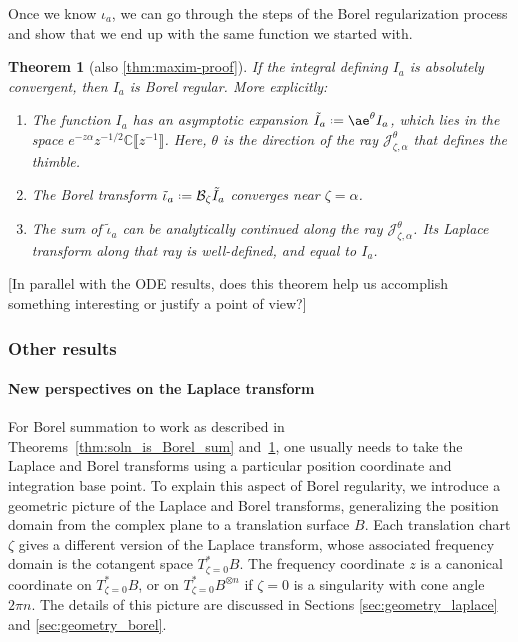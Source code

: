 \documentclass{article}
\newcommand{\C}{\mathbb{C}}
\newcommand{\series}[1]{\tilde{#1}}
\newcommand*{\defeq}{\mathrel{\vcenter{\baselineskip0.5ex \lineskiplimit0pt
                     \hbox{\scriptsize.}\hbox{\scriptsize.}}}%
                     =}
\newcommand{\borel}{\mathcal{B}}
\newcommand{\aexp}{\mathrm{\ae}}
\theoremstyle{definition}
\theoremstyle{plain}
\newtheorem{theorem}{Theorem}[section]
\newenvironment{todo}{\color{Coral}}{\color{black}}
\newenvironment{revised}{\color{DarkBlue}}{\color{black}}
\begin{document}
Once we know $\iota_a$, we can go through the steps of the Borel regularization process and show that we end up with the same function we started with.
\begin{theorem}[also \ref{thm:maxim-proof}]\label{thm:maxim}
If the integral defining $I_a$ is absolutely convergent, then $I_a$ is Borel regular. More explicitly:
\begin{enumerate}
\item\label{part-1} The function $I_a$ has an asymptotic expansion $\series{I}_a \defeq \aexp^\theta I_a$, which lies in the space $e^{-z \alpha} z^{-1/2} \C\llbracket z^{-1}\rrbracket$. Here, $\theta$ is the direction of the ray $\mathcal{J}^\theta_{\zeta, \alpha}$ that defines the thimble.
\item\label{part-2} The Borel transform $\series{\iota}_a \defeq \borel_\zeta \series{I}_a$ converges near $\zeta = \alpha$.
\item\label{part-3} The sum of $\series{\iota}_a$ can be analytically continued along the ray $\mathcal{J}_{\zeta, \alpha}^\theta$. Its Laplace transform along that ray is well-defined, and equal to $I_a$.
\end{enumerate}
\end{theorem}
\begin{todo}[In parallel with the ODE results, does this theorem help us accomplish something interesting or justify a point of view?]\end{todo}
%
\subsubsection{Other results}\label{sec:other_results}
%
\paragraph{New perspectives on the Laplace transform}
%
\begin{revised}For Borel summation to work as described in Theorems~\ref{thm:soln_is_Borel_sum} and~\ref{thm:maxim}, one usually needs to take the Laplace and Borel transforms using a particular position coordinate and integration base point. To explain this aspect of Borel regularity,\end{revised} we introduce a geometric picture of the Laplace and Borel transforms, generalizing the position domain from the complex plane to a translation surface $B$. Each translation chart $\zeta$ gives a different version of the Laplace transform, whose associated frequency domain is the cotangent space $T^*_{\zeta = 0} B$. The frequency coordinate $z$ is a canonical coordinate on $T^*_{\zeta = 0}B$, or on $T^*_{\zeta = 0}B^{\otimes n}$ if $\zeta = 0$ is a singularity with cone angle $2\pi n$. The details of this picture are discussed in Sections \ref{sec:geometry_laplace} and \ref{sec:geometry_borel}.
\begin{center}
\phaseSpaceLaplace
{}
\end{center}
\end{document}
